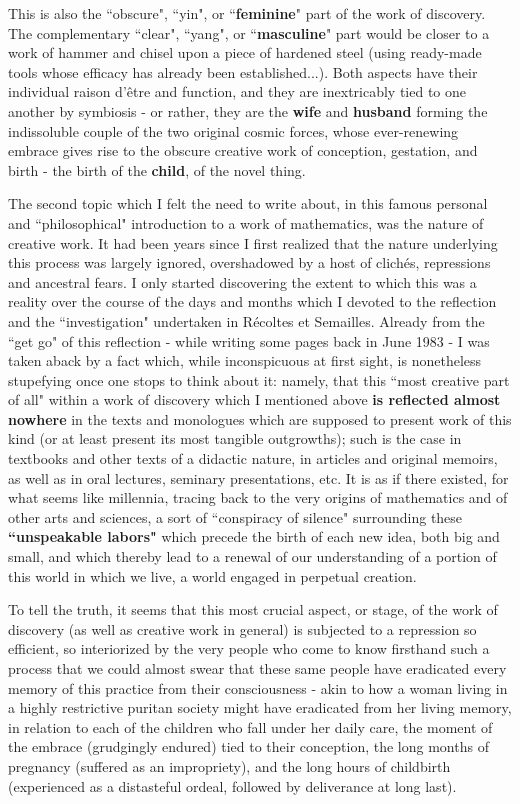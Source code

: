 This is also the ``obscure", ``yin", or ``\textbf{feminine}" part of the work of discovery. The complementary ``clear", ``yang", or ``\textbf{masculine}" part would be closer to a work of hammer and chisel upon a piece of hardened steel (using ready-made tools whose efficacy has already been established...). Both aspects have their  individual raison d'\^etre and function, and they are inextricably tied to one another by symbiosis - or rather, they are the \textbf{wife} and \textbf{husband} forming the indissoluble couple of the two original cosmic forces, whose ever-renewing embrace gives rise to the obscure creative work of conception, gestation, and birth - the birth of the \textbf{child}, of the novel thing. 

The second topic which I felt the need to write about, in this famous personal and ``philosophical" introduction to a work of mathematics, was the nature of creative work. It had been years since I first realized that the nature underlying this process was largely ignored, overshadowed by a host of clichés, repressions and ancestral fears. I only started discovering the extent to which this was a reality over the course of the days and months which I devoted to the reflection and the ``investigation" undertaken in R\'ecoltes et Semailles. Already from the ``get go" of this reflection - while writing some pages back in June 1983 - I was taken aback by a fact which, while inconspicuous at first sight, is nonetheless stupefying once one stops to think about it: namely, that this ``most creative part of all" within a work of discovery which I mentioned above \textbf{is reflected almost nowhere} in the texts and monologues which are supposed to present work of this kind (or at least present its most tangible outgrowths); such is the case in textbooks and other texts of a didactic nature, in articles and original memoirs, as well as in oral lectures, seminary presentations, etc. It is as if there existed, for what seems like millennia, tracing back to the very origins of mathematics and of other arts and sciences, a sort of ``conspiracy of silence" surrounding these \textbf{``unspeakable labors"} which precede the birth of each new idea, both big and small, and which thereby lead to a renewal of our understanding of a portion of this world in which we live, a world engaged in perpetual creation. 

To tell the truth, it seems that this most crucial aspect, or stage, of the work of discovery (as well as creative work in general) is subjected to a repression so efficient, so interiorized by the very people who come to know firsthand such a process that we could almost swear that these same people have eradicated every memory of this practice from their consciousness - akin to how a woman living in a highly restrictive puritan society might have eradicated from her living memory, in relation to each of the children who fall under her daily care, the moment of the embrace (grudgingly endured) tied to their conception, the long months of pregnancy (suffered as an impropriety), and the long hours of childbirth (experienced as a distasteful ordeal, followed by deliverance at long last).

